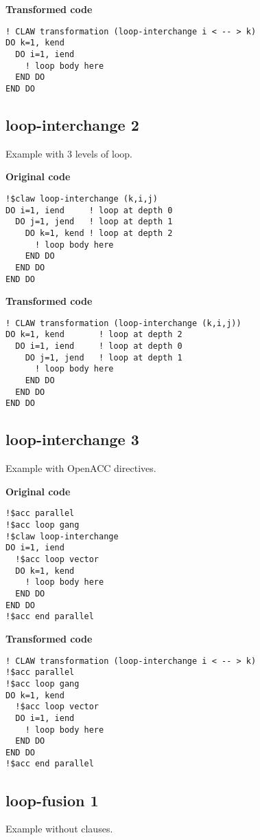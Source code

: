 \documentclass{article}
\begin{document}
\textbf{Transformed code}
\begin{lstlisting}
! CLAW transformation (loop-interchange i < -- > k)
DO k=1, kend
  DO i=1, iend
    ! loop body here
  END DO
END DO
\end{lstlisting}

\subsection{loop-interchange 2}
\label{loop-interchange2}
Example with 3 levels of loop. 

\textbf{Original code}
\begin{lstlisting}
!$claw loop-interchange (k,i,j)
DO i=1, iend     ! loop at depth 0
  DO j=1, jend   ! loop at depth 1
    DO k=1, kend ! loop at depth 2
      ! loop body here
    END DO
  END DO
END DO
\end{lstlisting}

\textbf{Transformed code}
\begin{lstlisting}
! CLAW transformation (loop-interchange (k,i,j))
DO k=1, kend       ! loop at depth 2
  DO i=1, iend     ! loop at depth 0
    DO j=1, jend   ! loop at depth 1
      ! loop body here
    END DO
  END DO
END DO
\end{lstlisting}

\subsection{loop-interchange 3}
\label{loop-interchange3}
Example with OpenACC directives. 

\textbf{Original code}
\begin{lstlisting}
!$acc parallel
!$acc loop gang
!$claw loop-interchange
DO i=1, iend
  !$acc loop vector
  DO k=1, kend
    ! loop body here
  END DO
END DO
!$acc end parallel
\end{lstlisting}

\textbf{Transformed code}
\begin{lstlisting}
! CLAW transformation (loop-interchange i < -- > k)
!$acc parallel
!$acc loop gang
DO k=1, kend
  !$acc loop vector
  DO i=1, iend
    ! loop body here
  END DO
END DO
!$acc end parallel
\end{lstlisting}

\subsection{loop-fusion 1}
Example without clauses. 
\end{document}
